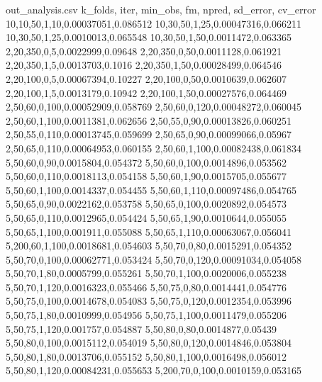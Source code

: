 %
%
%
%
% 
\usepackage{csvsimple}

\begin{filecontents*}{out_analysis.csv}
k_folds, iter, min_obs, fm, npred, sd_error, cv_error
10,10,50,1,10,0.00037051,0.086512
10,30,50,1,25,0.00047316,0.066211
10,30,50,1,25,0.0010013,0.065548
10,30,50,1,50,0.0011472,0.063365
2,20,350,0,5,0.0022999,0.09648
2,20,350,0,50,0.0011128,0.061921
2,20,350,1,5,0.0013703,0.1016
2,20,350,1,50,0.00028499,0.064546
2,20,100,0,5,0.00067394,0.10227
2,20,100,0,50,0.0010639,0.062607
2,20,100,1,5,0.0013179,0.10942
2,20,100,1,50,0.00027576,0.064469
2,50,60,0,100,0.00052909,0.058769
2,50,60,0,120,0.00048272,0.060045
2,50,60,1,100,0.0011381,0.062656
2,50,55,0,90,0.00013826,0.060251
2,50,55,0,110,0.00013745,0.059699
2,50,65,0,90,0.00099066,0.05967
2,50,65,0,110,0.00064953,0.060155
2,50,60,1,100,0.00082438,0.061834
5,50,60,0,90,0.0015804,0.054372
5,50,60,0,100,0.0014896,0.053562
5,50,60,0,110,0.0018113,0.054158
5,50,60,1,90,0.0015705,0.055677
5,50,60,1,100,0.0014337,0.054455
5,50,60,1,110,0.00097486,0.054765
5,50,65,0,90,0.0022162,0.053758
5,50,65,0,100,0.0020892,0.054573
5,50,65,0,110,0.0012965,0.054424
5,50,65,1,90,0.0010644,0.055055
5,50,65,1,100,0.001911,0.055088
5,50,65,1,110,0.00063067,0.056041
5,200,60,1,100,0.0018681,0.054603
5,50,70,0,80,0.0015291,0.054352
5,50,70,0,100,0.00062771,0.053424
5,50,70,0,120,0.00091034,0.054058
5,50,70,1,80,0.0005799,0.055261
5,50,70,1,100,0.0020006,0.055238
5,50,70,1,120,0.0016323,0.055466
5,50,75,0,80,0.0014441,0.054776
5,50,75,0,100,0.0014678,0.054083
5,50,75,0,120,0.0012354,0.053996
5,50,75,1,80,0.0010999,0.054956
5,50,75,1,100,0.0011479,0.055206
5,50,75,1,120,0.001757,0.054887
5,50,80,0,80,0.0014877,0.05439
5,50,80,0,100,0.0015112,0.054019
5,50,80,0,120,0.0014846,0.053804
5,50,80,1,80,0.0013706,0.055152
5,50,80,1,100,0.0016498,0.056012
5,50,80,1,120,0.00084231,0.055653
5,200,70,0,100,0.0010159,0.053165
\end{filecontents*}


